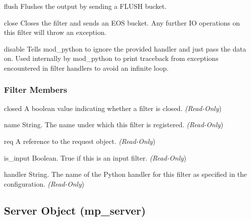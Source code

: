 \begin{methoddesc}[filter]{flush}{}
  Flushes the output by sending a FLUSH bucket.
\end{methoddesc}

\begin{methoddesc}[filter]{close}{}
  Closes the filter and sends an EOS bucket. Any further IO operations on
  this filter will throw an exception.
\end{methoddesc}

\begin{methoddesc}[filter]{disable}{}
  Tells mod_python to ignore the provided handler and just pass the data
  on. Used internally by mod_python to print traceback from exceptions
  encountered in filter handlers to avoid an infinite loop.
\end{methoddesc}

\subsubsection{Filter Members\label{pyapi-mpfilt-mem}}

\begin{memberdesc}[filter]{closed}
  A boolean value indicating whether a filter is closed.
  \emph{(Read-Only})
\end{memberdesc}

\begin{memberdesc}[filter]{name}
  String. The name under which this filter is registered.
  \emph{(Read-Only})
\end{memberdesc}

\begin{memberdesc}[filter]{req}
  A reference to the request object.
  \emph{(Read-Only})
\end{memberdesc}

\begin{memberdesc}[filter]{is_input}
  Boolean. True if this is an input filter.
  \emph{(Read-Only})
\end{memberdesc}

\begin{memberdesc}[filter]{handler}
  String. The name of the Python handler for this filter as specified in
  the configuration. 
  \emph{(Read-Only})
\end{memberdesc}

\subsection{Server Object (mp_server)\label{pyapi-mpserver}}

